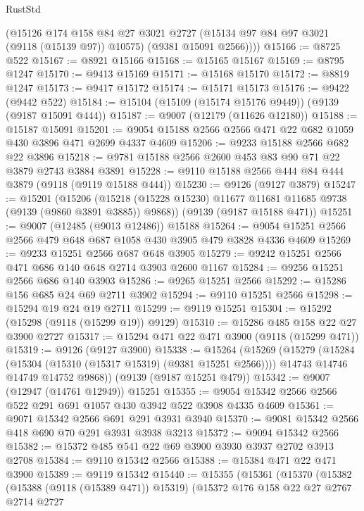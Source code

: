 \begin{lexlean}{RustStd}
\begin{coremodule}
        (@15126
          @174
          @158
          @84
          @27
          @3021
          @2727
          (@15134 @97 @84 @97 @3021 (@9118 (@15139 @97)) @10575)
          (@9381 @15091 @2566))))
@15166 := @8725 @522
@15167 := @8921 @15166
@15168 := @15165 @15167
@15169 := @8795 @1247
@15170 := @9413 @15169
@15171 := @15168 @15170
@15172 := @8819 @1247
@15173 := @9417 @15172
@15174 := @15171 @15173
@15176 := @9422 (@9442 @522)
@15184 := @15104 (@15109 (@15174 @15176 @9449)) (@9139 (@9187 @15091 @444))
@15187 := @9007 (@12179 (@11626 @12180))
@15188 := @15187 @15091
@15201 := @9054 @15188 @2566 @2566 @471 @22 @682 @1059 @430 @3896 @471 @2699 @4337 @4609
@15206 := @9233 @15188 @2566 @682 @22 @3896
@15218 := @9781 @15188 @2566 @2600 @453 @83 @90 @71 @22 @3879 @2743 @3884 @3891
@15228 := @9110 @15188 @2566 @444 @84 @444 @3879 (@9118 (@9119 @15188 @444))
@15230 := @9126 (@9127 @3879)
@15247 := @15201
    (@15206 (@15218 (@15228 @15230) @11677 @11681 @11685 @9738 (@9139 (@9860 @3891 @3885)) @9868))
    (@9139 (@9187 @15188 @471))
@15251 := @9007 (@12485 (@9013 @12486)) @15188
@15264 := @9054 @15251 @2566 @2566 @479 @648 @687 @1058 @430 @3905 @479 @3828 @4336 @4609
@15269 := @9233 @15251 @2566 @687 @648 @3905
@15279 := @9242 @15251 @2566 @471 @686 @140 @648 @2714 @3903 @2600 @1167
@15284 := @9256 @15251 @2566 @686 @140 @3903
@15286 := @9265 @15251 @2566
@15292 := @15286 @156 @685 @24 @69 @2711 @3902
@15294 := @9110 @15251 @2566
@15298 := @15294 @19 @24 @19 @2711
@15299 := @9119 @15251
@15304 := @15292 (@15298 (@9118 (@15299 @19)) @9129)
@15310 := @15286 @485 @158 @22 @27 @3900 @2727
@15317 := @15294 @471 @22 @471 @3900 (@9118 (@15299 @471))
@15319 := @9126 (@9127 @3900)
@15338 := @15264
    (@15269
      (@15279
        (@15284 (@15304 (@15310 (@15317 @15319) (@9381 @15251 @2566))))
        @14743
        @14746
        @14749
        @14752
        @9868))
    (@9139 (@9187 @15251 @479))
@15342 := @9007 (@12947 (@14761 @12949)) @15251
@15355 := @9054 @15342 @2566 @2566 @522 @291 @691 @1057 @430 @3942 @522 @3908 @4335 @4609
@15361 := @9071 @15342 @2566 @691 @291 @3931 @3940
@15370 := @9081 @15342 @2566 @418 @690 @70 @291 @3931 @3938 @3213
@15372 := @9094 @15342 @2566
@15382 := @15372 @485 @541 @22 @69 @3900 @3930 @3937 @2702 @3913 @2708
@15384 := @9110 @15342 @2566
@15388 := @15384 @471 @22 @471 @3900
@15389 := @9119 @15342
@15440 := @15355
    (@15361
      (@15370
        (@15382
          (@15388 (@9118 (@15389 @471)) @15319)
          (@15372
            @176
            @158
            @22
            @27
            @2767
            @2714
            @2727

\end{coremodule}
\end{lexlean}
